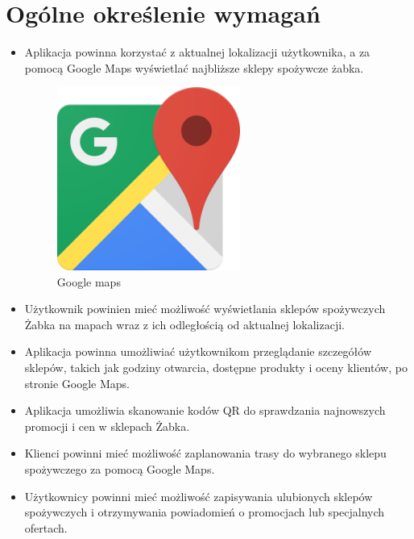 	\newpage
\section{Ogólne określenie wymagań}		%
\begin{itemize}
	\item Aplikacja powinna korzystać z aktualnej lokalizacji użytkownika, a za pomocą Google Maps wyświetlać najbliższe sklepy spożywcze żabka.
	\begin{figure}[!hbt]
		\begin{center}
			\includegraphics[width=6cm]{rys/Google-maps.png}
			\caption{Google maps}
			\label{rys:gps-icon}
		\end{center}
	\end{figure}
	\item Użytkownik powinien mieć możliwość wyświetlania sklepów spożywczych Żabka na mapach wraz z ich odległością od aktualnej lokalizacji.
	\item Aplikacja powinna umożliwiać użytkownikom przeglądanie szczegółów sklepów, takich jak godziny otwarcia, dostępne produkty i oceny klientów, po stronie Google Maps.
	\item Aplikacja umożliwia skanowanie kodów QR do sprawdzania najnowszych promocji i cen w sklepach Żabka.
	\item Klienci powinni mieć możliwość zaplanowania trasy do wybranego sklepu spożywczego za pomocą Google Maps.
	\item Użytkownicy powinni mieć możliwość zapisywania ulubionych sklepów spożywczych i otrzymywania powiadomień o promocjach lub specjalnych ofertach.	
\end{itemize}